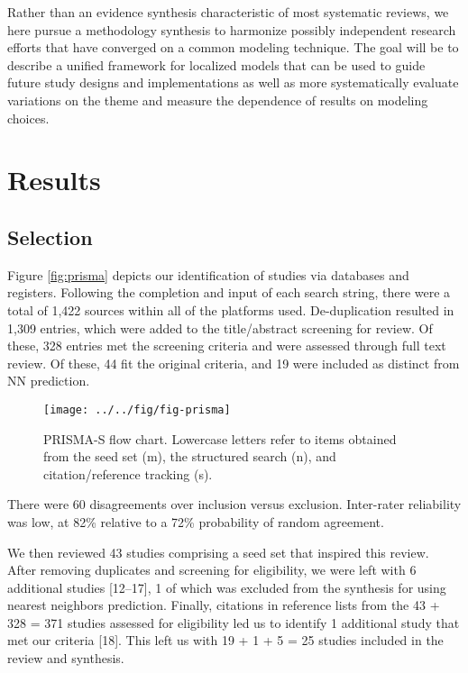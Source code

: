 \documentclass[preprint, 3p,
authoryear]{elsarticle} %
\begin{document}
Rather than an evidence synthesis characteristic of most systematic
reviews, we here pursue a methodology synthesis to harmonize possibly
independent research efforts that have converged on a common modeling
technique. The goal will be to describe a unified framework for
localized models that can be used to guide future study designs and
implementations as well as more systematically evaluate variations on
the theme and measure the dependence of results on modeling choices.

\hypertarget{results}{%
\section{Results}\label{results}}

\hypertarget{selection}{%
\subsection{Selection}\label{selection}}

Figure \ref{fig:prisma} depicts our identification of studies via
databases and registers. Following the completion and input of each
search string, there were a total of 1,422 sources within all of the
platforms used. De-duplication resulted in 1,309 entries, which were
added to the title/abstract screening for review. Of these, 328 entries
met the screening criteria and were assessed through full text review.
Of these, 44 fit the original criteria, and 19 were included as distinct
from NN prediction.

\begin{figure}

{\centering \texttt{[image: ../../fig/fig-prisma]} 

}

\caption{\label{fig:prisma}PRISMA-S flow chart. Lowercase letters refer to items obtained from the seed set (m), the structured search (n), and citation/reference tracking (s).}\label{fig:fig:prisma}
\end{figure}

There were 60 disagreements over inclusion versus exclusion. Inter-rater
reliability was low, at 82\% relative to a 72\% probability of random
agreement.

We then reviewed 43 studies comprising a seed set that inspired this
review. After removing duplicates and screening for eligibility, we were
left with 6 additional studies {[}12--17{]}, 1 of which was excluded
from the synthesis for using nearest neighbors prediction. Finally,
citations in reference lists from the 43 + 328 = 371 studies assessed
for eligibility led us to identify 1 additional study that met our
criteria {[}18{]}. This left us with 19 + 1 + 5 = 25 studies included in
the review and synthesis.
\end{document}
